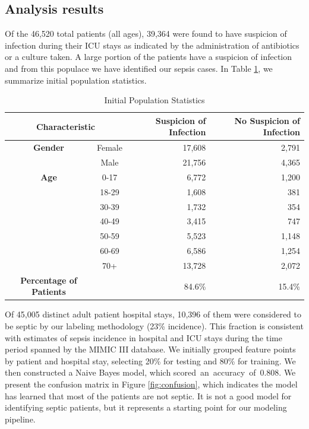 \documentclass{amia}
\begin{document}
\subsection*{Analysis results}
	 Of the 46,520 total patients (all ages), 39,364 were found
	to have suspicion of infection during their ICU stays as
	indicated by the administration of antibiotics or a culture
	taken. 
	 A large portion of the patients have a suspicion of
	infection and from this populace we have identified our sepsis
	cases.  In Table \ref{tab:popstat}, we summarize initial 
        population statistics.
        
\begin{table}[H]
\centering
\begin{tabular}{c c rr}
\toprule
\multicolumn{2}{c}{Characteristic} &Suspicion of Infection & No Suspicion of Infection \\
\midrule
\textbf{Gender} & Female &  17,608 & 2,791\\
             &  Male    &  21,756  & 4,365\\
\rule{0pt}{4ex}    
\textbf{Age}      & 0-17   &  6,772  & 1,200\\
             &  18-29   &  1,608  & 381\\
             &  30-39   &  1,732 & 354\\
             &  40-49   & 3,415  &  747\\
             &  50-59   &  5,523  & 1,148\\
             &  60-69   &  6,586  & 1,254\\
             &  70+       &  13,728  & 2,072\\
\rule{0pt}{4ex}    
\textbf{Percentage of Patients} & & 84.6\% & 15.4\%\\
\bottomrule
\end{tabular}
\caption{Initial Population Statistics}\label{tab:popstat}
\end{table}

    Of 45,005 distinct adult patient hospital stays, 10,396 of them were considered to be septic by our 
labeling methodology (23\% incidence). 
This fraction is consistent with estimates of sepsis incidence in hospital and ICU stays during the time period spanned
by the MIMIC III database.\cite{nee2006} We initially grouped feature points by patient and hospital stay, selecting
20\% for testing and 80\% for training.  We then constructed a Naive Bayes model, which scored~an~accuracy~of~0.808.
We present the confusion matrix in Figure \ref{fig:confusion}, which indicates the model has learned that most of the
patients are not septic.  It is not a good model for identifying septic patients, but it represents a starting 
point for our modeling pipeline.
    
\end{document}
